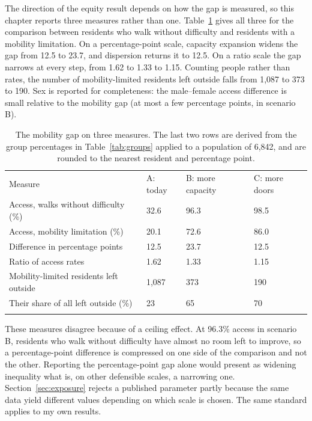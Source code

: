 \documentclass[graybox]{svmult}
\begin{document}
The direction of the equity result depends on how the gap is measured, so this
chapter reports three measures rather than one. Table~\ref{tab:gap} gives all
three for the comparison between residents who walk without difficulty and
residents with a mobility limitation. On a percentage-point scale, capacity
expansion widens the gap from 12.5 to 23.7, and dispersion returns it to 12.5.
On a ratio scale the gap narrows at every step, from 1.62 to 1.33 to 1.15.
Counting people rather than rates, the number of mobility-limited residents
left outside falls from 1,087 to 373 to 190. Sex is reported for completeness:
the male--female access difference is small relative to the mobility gap (at
most a few percentage points, in scenario B).

\begin{table}[t]
\caption{The mobility gap on three measures. The last two rows are derived from
the group percentages in Table~\ref{tab:groups} applied to a population of 6,842,
and are rounded to the nearest resident and percentage point.}
\label{tab:gap}
\begin{tabular}{p{5.1cm}p{1.6cm}p{1.6cm}p{1.6cm}}
\hline\noalign{\smallskip}
Measure & A: today & B: more capacity & C: more doors \\
\noalign{\smallskip}\svhline\noalign{\smallskip}
Access, walks without difficulty (\%) & 32.6 & 96.3 & 98.5 \\
Access, mobility limitation (\%) & 20.1 & 72.6 & 86.0 \\
Difference in percentage points & 12.5 & 23.7 & 12.5 \\
Ratio of access rates & 1.62 & 1.33 & 1.15 \\
Mobility-limited residents left outside & 1,087 & 373 & 190 \\
Their share of all left outside (\%) & 23 & 65 & 70 \\
\noalign{\smallskip}\hline
\end{tabular}
\end{table}

These measures disagree because of a ceiling effect. At 96.3\% access in scenario
B, residents who walk without difficulty have almost no room left to improve, so
a percentage-point difference is compressed on one side of the comparison and not
the other. Reporting the percentage-point gap alone would present as widening
inequality what is, on other defensible scales, a narrowing one.
Section~\ref{sec:exposure} rejects a published parameter partly because the same
data yield different values depending on which scale is chosen. The same standard
applies to my own results.
\end{document}
